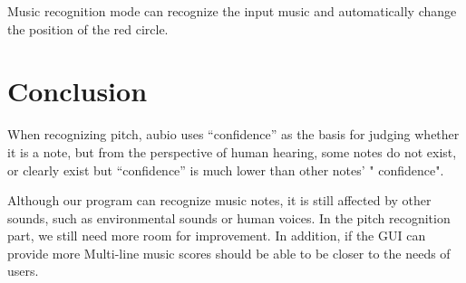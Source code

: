 \documentclass[10pt,twocolumn,letterpaper]{article}
\begin{document}
\begin{CJK}{UTF8}{bsmi}
Music recognition mode can recognize the input music and automatically change the position of the red circle.

\section{Conclusion}

When recognizing pitch, aubio uses “confidence” as the basis for judging whether it is a note, but from the perspective of human hearing, some notes do not exist, or clearly exist but “confidence” is much lower than other notes’ " confidence".

Although our program can recognize music notes, it is still affected by other sounds, such as environmental sounds or human voices. In the pitch recognition part, we still need more room for improvement. In addition, if the GUI can provide more Multi-line music scores should be able to be closer to the needs of users.


\end{CJK}
\end{document}
